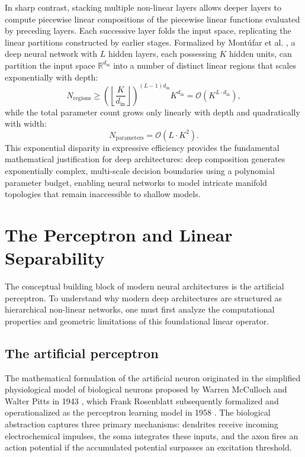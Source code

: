 \documentclass[../../main.tex]{subfiles}
\begin{document}
In sharp contrast, stacking multiple non-linear layers allows deeper layers to compute piecewise linear compositions of the piecewise linear functions evaluated by preceding layers. Each successive layer folds the input space, replicating the linear partitions constructed by earlier stages. Formalized by Montúfar et al. \citep{montufar2014number}, a deep neural network with $L$ hidden layers, each possessing $K$ hidden units, can partition the input space $\mathbb{R}^{d_{\text{in}}}$ into a number of distinct linear regions that scales exponentially with depth:
\begin{equation}
N_{\text{regions}} \ge \left( \left\lfloor \frac{K}{d_{\text{in}}} \right\rfloor \right)^{(L-1) d_{\text{in}}} K^{d_{\text{in}}} = \mathcal{O}\left( K^{L \cdot d_{\text{in}}} \right),
\end{equation}
while the total parameter count grows only linearly with depth and quadratically with width:
\begin{equation}
N_{\text{parameters}} = \mathcal{O}\left( L \cdot K^2 \right).
\end{equation}
This exponential disparity in expressive efficiency provides the fundamental mathematical justification for deep architectures: deep composition generates exponentially complex, multi-scale decision boundaries using a polynomial parameter budget, enabling neural networks to model intricate manifold topologies that remain inaccessible to shallow models.

\clearpage
\section{The Perceptron and Linear Separability}
\label{sec:perceptron_linear_barrier}

The conceptual building block of modern neural architectures is the artificial perceptron. To understand why modern deep architectures are structured as hierarchical non-linear networks, one must first analyze the computational properties and geometric limitations of this foundational linear operator.

\subsection{The artificial perceptron}
\label{subsec:artificial_perceptron}

The mathematical formulation of the artificial neuron originated in the simplified physiological model of biological neurons proposed by Warren McCulloch and Walter Pitts in 1943 \citep{mcculloch1943}, which Frank Rosenblatt subsequently formalized and operationalized as the perceptron learning model in 1958 \citep{rosenblatt1958}. The biological abstraction captures three primary mechanisms: dendrites receive incoming electrochemical impulses, the soma integrates these inputs, and the axon fires an action potential if the accumulated potential surpasses an excitation threshold.
\end{document}
